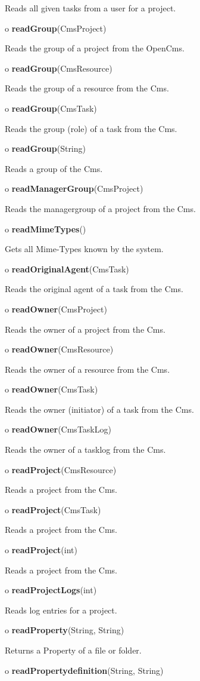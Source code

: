 \begin{description}
Reads all given tasks from a user for a project.  
\item o {\bf readGroup}(CmsProject)  

Reads the group of a project from the OpenCms.  
\item o {\bf readGroup}(CmsResource)  

Reads the group of a resource from the Cms.  
\item o {\bf readGroup}(CmsTask)  

Reads the group (role) of a task from the Cms.  
\item o {\bf readGroup}(String)  

Reads a group of the Cms.  
\item o {\bf readManagerGroup}(CmsProject)  

Reads the managergroup of a project from the Cms.  
\item o {\bf readMimeTypes}()  

Gets all Mime-Types known by the system.  
\item o {\bf readOriginalAgent}(CmsTask)  

Reads the original agent of a task from the Cms.  
\item o {\bf readOwner}(CmsProject)  

Reads the owner of a project from the Cms.  
\item o {\bf readOwner}(CmsResource)  

Reads the owner of a resource from the Cms.  
\item o {\bf readOwner}(CmsTask)  

Reads the owner (initiator) of a task from the Cms.  
\item o {\bf readOwner}(CmsTaskLog)  

Reads the owner of a tasklog from the Cms.  
\item o {\bf readProject}(CmsResource)  

Reads a project from the Cms.  
\item o {\bf readProject}(CmsTask)  

Reads a project from the Cms.  
\item o {\bf readProject}(int)  

Reads a project from the Cms.  
\item o {\bf readProjectLogs}(int)  

Reads log entries for a project.  
\item o {\bf readProperty}(String, String)  

Returns a Property of a file or folder.  
\item o {\bf readPropertydefinition}(String, String)  


\end{description}
